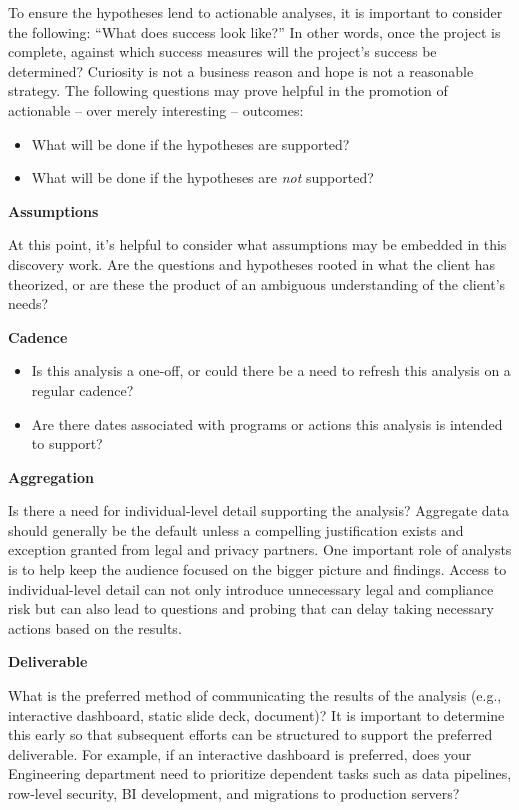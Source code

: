 \documentclass[
]{book}
\providecommand{\tightlist}{%
  \setlength{\itemsep}{0pt}\setlength{\parskip}{0pt}}
\begin{document}
To ensure the hypotheses lend to actionable analyses, it is important to consider the following: ``What does success look like?'' In other words, once the project is complete, against which success measures will the project's success be determined? Curiosity is not a business reason and hope is not a reasonable strategy. The following questions may prove helpful in the promotion of actionable -- over merely interesting -- outcomes:

\begin{itemize}
\tightlist
\item
  What will be done if the hypotheses are supported?
\item
  What will be done if the hypotheses are \emph{not} supported?
\end{itemize}

\textbf{Assumptions}

At this point, it's helpful to consider what assumptions may be embedded in this discovery work. Are the questions and hypotheses rooted in what the client has theorized, or are these the product of an ambiguous understanding of the client's needs?

\textbf{Cadence}

\begin{itemize}
\tightlist
\item
  Is this analysis a one-off, or could there be a need to refresh this analysis on a regular cadence?
\item
  Are there dates associated with programs or actions this analysis is intended to support?
\end{itemize}

\textbf{Aggregation}

Is there a need for individual-level detail supporting the analysis? Aggregate data should generally be the default unless a compelling justification exists and exception granted from legal and privacy partners. One important role of analysts is to help keep the audience focused on the bigger picture and findings. Access to individual-level detail can not only introduce unnecessary legal and compliance risk but can also lead to questions and probing that can delay taking necessary actions based on the results.

\textbf{Deliverable}

What is the preferred method of communicating the results of the analysis (e.g., interactive dashboard, static slide deck, document)? It is important to determine this early so that subsequent efforts can be structured to support the preferred deliverable. For example, if an interactive dashboard is preferred, does your Engineering department need to prioritize dependent tasks such as data pipelines, row-level security, BI development, and migrations to production servers?
\end{document}
